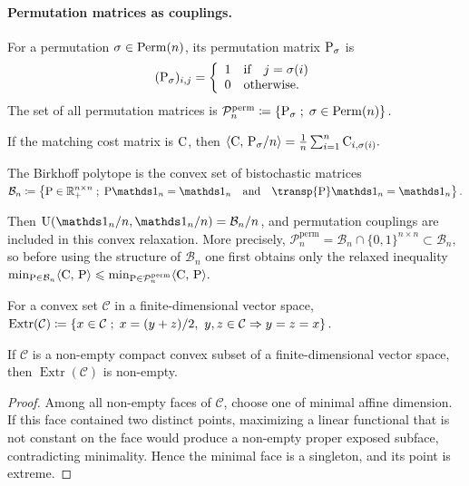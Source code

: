 \paragraph{Permutation matrices as couplings.}
\begin{defn}\label{def-permutation-matrices}
For a permutation $\sigma\in\Perm(n)$, its permutation matrix $\P_\sigma$ is
\[
(\P_\sigma)_{i,j}=\choice{1 \qifq j=\sigma(i)\\ 0 \quad\text{otherwise}.}
\]
The set of all permutation matrices is \(\mathcal P_n^{\mathrm{perm}} \eqdef \enscond{\P_\sigma}{\sigma\in\Perm(n)}.\)
\end{defn}
If the matching cost matrix is $\C$, then
\(\dotp{\C}{\P_\sigma/n}=\frac1n\sum_{i=1}^n \C_{i,\sigma(i)}.\)
\begin{defn}\label{def-birkhoff-polytope}
The Birkhoff polytope is the convex set of bistochastic matrices
\(\mathcal B_n \eqdef \enscond{\P\in\RR_+^{n\times n}}{\P\ones_n=\ones_n \qandq \transp{\P}\ones_n=\ones_n}.\)
\end{defn}
Then $\CouplingsD(\ones_n/n,\ones_n/n)=\mathcal B_n/n$, and permutation couplings are included in this convex relaxation. More precisely, \(\mathcal P_n^{\mathrm{perm}} = \mathcal B_n\cap\{0,1\}^{n\times n} \subset \mathcal B_n,\)
so before using the structure of $\mathcal B_n$ one first obtains only the relaxed inequality
\(\min_{\P\in\mathcal B_n}\dotp{\C}{\P} \leq \min_{\P\in\mathcal P_n^{\mathrm{perm}}}\dotp{\C}{\P}.\)
\begin{defn}\label{def-extreme-points}
For a convex set $\mathcal C$ in a finite-dimensional vector space, \(\operatorname{Extr}(\mathcal C) \eqdef \enscond{x\in\mathcal C}{x=(y+z)/2,\ y,z\in\mathcal C \Rightarrow y=z=x}.\)
\end{defn}
\begin{prop}\label{prop-extreme-point-existence}
If $\mathcal C$ is a non-empty compact convex subset of a finite-dimensional vector space, then $\operatorname{Extr}(\mathcal C)$ is non-empty.
\end{prop}
\begin{proof}
Among all non-empty faces of $\mathcal C$, choose one of minimal affine dimension. If this face contained two distinct points, maximizing a linear functional that is not constant on the face would produce a non-empty proper exposed subface, contradicting minimality. Hence the minimal face is a singleton, and its point is extreme.
\end{proof}
